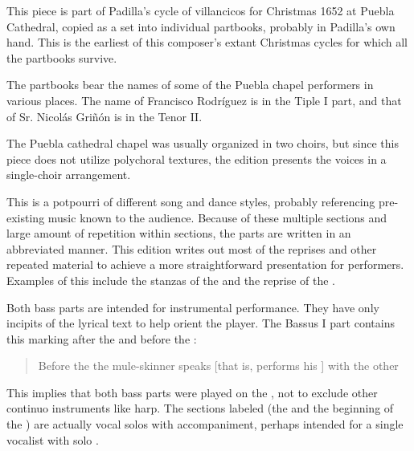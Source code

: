 
\begin{notesources}

\begin{source}
\end{source}

\end{notesources}

This piece is part of Padilla's cycle of villancicos for Christmas 1652 at Puebla Cathedral, copied as a set into individual partbooks, probably in Padilla's own hand.
This is the earliest of this composer's extant Christmas cycles for which all the partbooks survive.

The partbooks bear the names of some of the Puebla chapel performers in various places.
The name of Francisco Rodríguez is in the Tiple I part, and that of Sr. Nicolás Griñón is in the Tenor II.


The Puebla cathedral chapel was usually organized in two choirs, but since this piece does not utilize polychoral textures, the edition presents the voices in a single-choir arrangement.

This  is a potpourri of different song and dance styles, probably referencing pre-existing music known to the audience.
Because of these multiple sections and large amount of repetition within sections, the parts are written in an abbreviated manner.
This edition writes out most of the reprises and other repeated material to achieve a more straightforward presentation for performers.
Examples of this include the stanzas of the  and the  reprise of the .



Both bass parts are intended for instrumental performance.
They have only incipits of the lyrical text to help orient the player.
The Bassus I part contains this marking after the  and before the :
\begin{quote}
Before the  the mule-skinner speaks [that is, performs his ] with the other 
\end{quote}
This implies that both bass parts were played on the , not to exclude other continuo instruments like harp.
The sections labeled  (the  and the beginning of the ) are actually vocal solos with accompaniment, perhaps intended for a single vocalist with solo .


